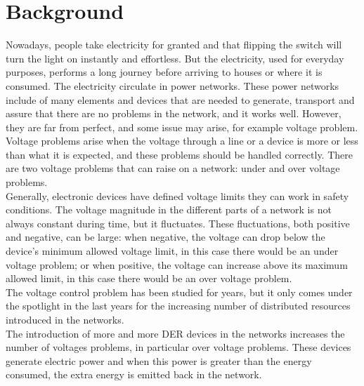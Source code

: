 \chapter{Background}


Nowadays, people take electricity for granted and that flipping the switch will turn the light on instantly and effortless. But the electricity, used for everyday purposes, performs a long journey before arriving to houses or where it is consumed. The electricity circulate in power networks. These power networks include of many elements and devices that are needed to generate, transport and assure that there are no problems in the network, and it works well. However, they are far from perfect, and some issue may arise, for example voltage problem. Voltage problems arise when the voltage through a line or a device is more or less than what it is expected, and these problems should be handled correctly. There are two voltage problems that can raise on a network: under and over voltage problems.\\
Generally, electronic devices have defined voltage limits they can work in safety conditions. The voltage magnitude in the different parts of a network is not always constant during time, but it fluctuates. These fluctuations, both positive and negative, can be large: when negative, the voltage can drop below the device's minimum allowed voltage limit, in this case there would be an under voltage problem; or when positive, the voltage can increase above its maximum allowed limit, in this case there would be an over voltage problem. \\

The voltage control problem has been studied for years, but it only comes under the spotlight in the last years for the increasing number of distributed resources introduced in the networks. \\
The introduction of more and more \gls{DER} devices in the networks increases the number of voltages problems, in particular over voltage problems. These devices generate electric power and when this power is greater than the energy consumed, the extra energy is emitted back in the network.\\ %


